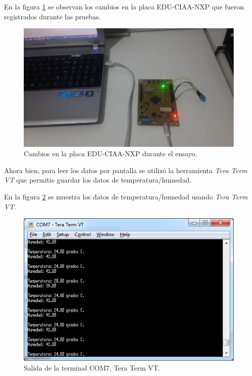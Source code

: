 En la figura \ref{fig:TestPlaca} se observan los cambios en la placa EDU-CIAA-NXP que fueron registrados durante las pruebas.

\begin{figure}[ht]
	\centering
	\includegraphics[scale=.50]{./Figures/TestPlaca.jpeg}
	\caption{Cambios en la placa EDU-CIAA-NXP durante el ensayo.}
	\label{fig:TestPlaca}
\end{figure}

Ahora bien, para leer los datos por pantalla se utilizó la herramienta \textit{Tera Term VT} que permitie guardar los datos de temperatura/humedad.

En la figura \ref{fig:TestTerminal} se muestra los datos de temperatura/humedad usando \textit{Tera Term VT}. 

\begin{figure}[ht]
	\centering
	\includegraphics[scale=.90]{./Figures/TestTerminal.png}
	\caption{Salida de la terminal COM7, Tera Term VT.}
	\label{fig:TestTerminal}
\end{figure}

